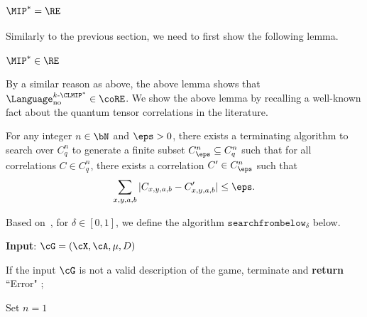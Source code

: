 \subsubsection{$\MIP^*=\RE$} \label{sec:MIPREproof}

Similarly to the previous section, we need to first show the following lemma. 
\begin{lemma} \label{lem:MIPstartbound}
	$\MIP^* \in \RE$
\end{lemma}
By a similar reason as above, the above lemma shows that $\Language^{k\text{-}\CLMIP^*}_{\text{no}} \in \coRE$. We show the above lemma by recalling a well-known fact about the quantum tensor correlations in the literature.
\begin{fact} \label{fact:disCorrelations}
	For any integer $n \in \bN$ and $\eps > 0$, there exists a terminating algorithm to search over $C_q^n$ to generate a finite subset $C_{\eps}^n \subseteq C_q^n$ such that for all correlations $C \in C_q^n$, there exists a correlation $C' \in C_{\eps}^n$ such that 
	\begin{equation*}
		\sum_{x,y,a,b} |C_{x,y,a,b} - C'_{x,y,a,b} | \leq \eps.
	\end{equation*}
\end{fact}

Based on~, for $\delta \in [0,1]$, we define the algorithm $\texttt{searchfrombelow}_{\delta}$ below. 

\vspace{10pt}
\IncMargin{1em}
\begin{algorithm}[H]
	\DontPrintSemicolon
	
	\textbf{Input}: $\cG = (\cX, \cA, \mu, D)$
	
	If the input $\cG$ is not a valid description of the game, terminate and \textbf{return} ``Error" ; 
	
	Set $n = 1$
	
	\caption{The description for \gls{Searchfrombelow} for $\eps \in [0,1)$.}
	\label{pseu:searchfrombelow}
\end{algorithm}\DecMargin{1em}
\vspace{10pt} 

